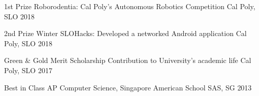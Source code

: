 



\begin{cvhonors}

  \cvhonor
    {1st Prize} %
    {Roborodentia: Cal Poly's Autonomous Robotics Competition} %
    {Cal Poly, SLO} %
    {2018} %

  \cvhonor
    {2nd Prize} %
    {Winter SLOHacks: Developed a networked Android application} %
    {Cal Poly, SLO} %
    {2018} %

\end{cvhonors}




\begin{cvhonors}

  \cvhonor
    {Green \& Gold Merit Scholarship} %
    {Contribution to University's academic life} %
    {Cal Poly, SLO} %
    {2017} %

  \cvhonor
    {Best in Class} %
    {AP Computer Science, Singapore American School} %
    {SAS, SG} %
    {2013} %


\end{cvhonors}

